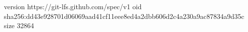 version https://git-lfs.github.com/spec/v1
oid sha256:dd43e928701d06069aad41cf11eee8ed4a2dbb606d2c4a230a9ac87834a9d35c
size 32864
